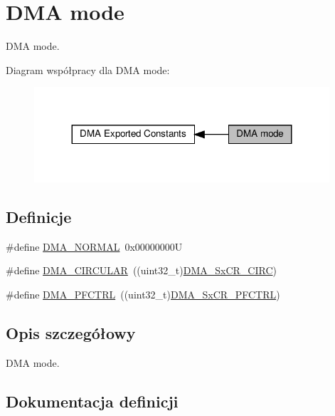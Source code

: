 \hypertarget{group___d_m_a__mode}{}\section{D\+MA mode}
\label{group___d_m_a__mode}


D\+MA mode.  


Diagram współpracy dla D\+MA mode\+:\nopagebreak
\begin{figure}[H]
\begin{center}
\leavevmode
\includegraphics[width=311pt]{group___d_m_a__mode}
\end{center}
\end{figure}
\subsection*{Definicje}
\begin{DoxyCompactItemize}
\item 
\#define \hyperlink{group___d_m_a__mode_ga04941acfbbdefc53e1e08133cffa3b8a}{D\+M\+A\+\_\+\+N\+O\+R\+M\+AL}~0x00000000U
\item 
\#define \hyperlink{group___d_m_a__mode_ga4c4f425cba13edffb3c831c036c91e01}{D\+M\+A\+\_\+\+C\+I\+R\+C\+U\+L\+AR}~((uint32\+\_\+t)\hyperlink{group___peripheral___registers___bits___definition_gadc248dbc519cc580621cdadcdd8741fb}{D\+M\+A\+\_\+\+Sx\+C\+R\+\_\+\+C\+I\+RC})
\item 
\#define \hyperlink{group___d_m_a__mode_ga7974ee645c8e275a2297cf37eec9e022}{D\+M\+A\+\_\+\+P\+F\+C\+T\+RL}~((uint32\+\_\+t)\hyperlink{group___peripheral___registers___bits___definition_ga11f412d256043bec3e01ceef7f2099f2}{D\+M\+A\+\_\+\+Sx\+C\+R\+\_\+\+P\+F\+C\+T\+RL})
\end{DoxyCompactItemize}


\subsection{Opis szczegółowy}
D\+MA mode. 



\subsection{Dokumentacja definicji}
\mbox{\label{group___d_m_a__mode_ga4c4f425cba13edffb3c831c036c91e01}} 
